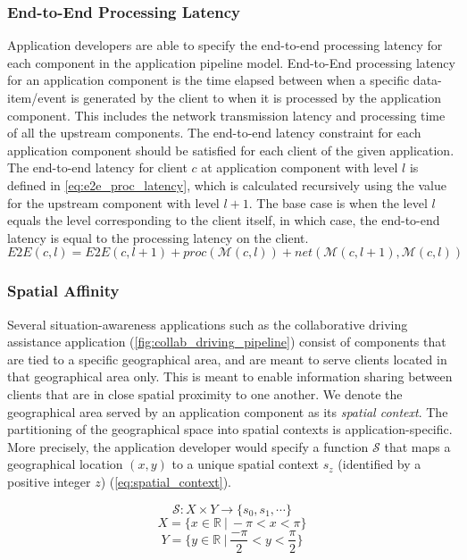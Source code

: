 \subsubsection{End-to-End Processing Latency}
Application developers are able to specify the end-to-end processing latency for each component in the application pipeline model. End-to-End processing latency for an application component is the time elapsed between when a specific data-item/event is generated by the client to when it is processed by the application component. This includes the network transmission latency and processing time of all the upstream components. The end-to-end latency constraint for each application component should be satisfied for each client of the given application. The end-to-end latency for client $c$ at application component with level $l$ is defined in \cref{eq:e2e_proc_latency}, which is calculated recursively using the value for the upstream component with level $l+1$. The base case is when the level $l$ equals the level corresponding to the client itself, in which case, the end-to-end latency is equal to the processing latency on the client.
\begin{equation}
\label{eq:e2e_proc_latency}
E2E \left( c, l \right) = E2E \left(c , l+1 \right) + proc \left( \mathcal{M} \left( c, l \right) \right) + net \left(  \mathcal{M} \left( c, l+1 \right) , \mathcal{M} \left( c, l \right) \right)
\end{equation}

\subsubsection{Spatial Affinity}
Several situation-awareness applications such as the collaborative driving assistance application (\cref{fig:collab_driving_pipeline}) consist of components that are tied to a specific geographical area, and are meant to serve clients located in that geographical area only. This is meant to enable information sharing between clients that are in close spatial proximity to one another. We denote the geographical area served by an application component as its \textit{spatial context}. The partitioning of the geographical space into spatial contexts is application-specific. More precisely, the application developer would specify a function $\mathcal{S}$ that maps a geographical location $\left( x , y \right)$ to a unique spatial context $s_z$ (identified by a positive integer $z$) (\cref{eq:spatial_context}).

\begin{equation}
\label{eq:spatial_context}
   \mathcal{S}: X \times Y \rightarrow \{ s_0, s_1, \cdots \}
\end{equation}
\begin{equation}
   X = \{x \in \mathbb{R}~|~-\pi < x < \pi\}
\end{equation}
\begin{equation}
   Y = \{y \in \mathbb{R}~|~\dfrac{-\pi}{2} < y < \dfrac{\pi}{2}\}
\end{equation}

